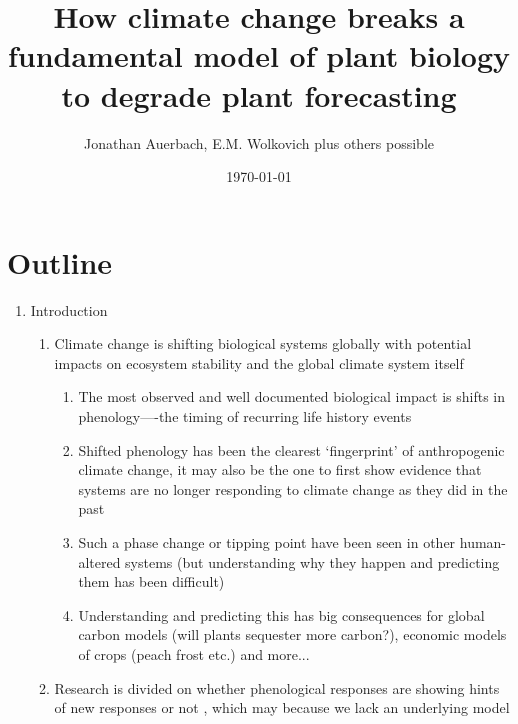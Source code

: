 \documentclass[11pt]{article}
\begin{document}
\renewcommand{\refname}{\CHead{}}


\title{How climate change breaks a fundamental model of plant biology to degrade plant forecasting} 
\author{Jonathan Auerbach, E.M. Wolkovich plus others possible} %
\date{\today}
\maketitle

\section{Outline}

\begin{enumerate}
\item Introduction
\begin{enumerate}
\item Climate change is shifting biological systems globally with potential impacts on ecosystem stability and the global climate system itself \citep{richardson2023earth}
\begin{enumerate}
\item The most observed and well documented biological impact is shifts in phenology----the timing of recurring life history events \citep{ipcc2022,Menzel1999,Root:2003kl}
\item Shifted phenology has been the clearest `fingerprint' of anthropogenic climate change, it may also be the one to first show evidence that systems are no longer responding to climate change as they did in the past \citep{piao2019plant,vitasse2022great}
\item Such a phase change or tipping point \citep{Dakos2013} have been seen in other human-altered systems (but understanding why they happen and predicting them has been difficult) \citep{Chavez2003}
\item Understanding and predicting this has big consequences for global carbon models (will plants sequester more carbon?), economic models of crops (peach frost etc.) and more... \citep{chamberlain2021climate,zohner2020late,lamichhane2021rising}
\end{enumerate}
\item Research is divided on whether phenological responses are showing hints of new responses \citep{fu2015declining,gusewell2017changes} or not \citep{wolkovich2021simple}, which may because we lack an underlying model

\end{enumerate}
\end{enumerate}
\end{document}
